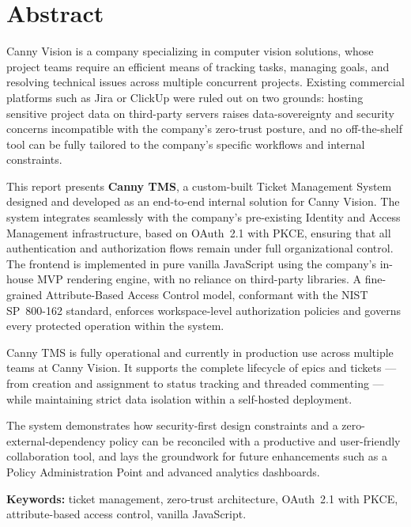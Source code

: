 \chapter*{Abstract}

{
Canny Vision is a company specializing in computer vision solutions, whose
project teams require an efficient means of tracking tasks, managing goals, and resolving
technical issues across multiple concurrent projects. Existing commercial platforms such as
Jira or ClickUp were ruled out on two grounds: hosting sensitive project data on third-party
servers raises data-sovereignty and security concerns incompatible with the company's
zero-trust posture, and no off-the-shelf tool can be fully tailored to the company's specific
workflows and internal constraints.

This report presents \textbf{Canny TMS}, a custom-built Ticket Management System designed
and developed as an end-to-end internal solution for Canny Vision. The system integrates
seamlessly with the company's pre-existing Identity and Access Management infrastructure,
based on OAuth~2.1 with PKCE, ensuring that all authentication and authorization flows
remain under full organizational control. The frontend is implemented in pure vanilla
JavaScript using the company's in-house MVP rendering engine, with no reliance on
third-party libraries. A fine-grained Attribute-Based Access Control model, conformant
with the NIST SP~800-162 standard, enforces workspace-level authorization policies and
governs every protected operation within the system.

Canny TMS is fully operational and currently in production use across multiple teams at
Canny Vision. It supports the complete lifecycle of epics and tickets --- from creation
and assignment to status tracking and threaded commenting --- while maintaining strict
data isolation within a self-hosted deployment.

The system demonstrates how security-first design constraints and a zero-external-dependency
policy can be reconciled with a productive and user-friendly collaboration tool, and lays
the groundwork for future enhancements such as a Policy Administration Point and advanced
analytics dashboards.

\bigskip
\noindent\textbf{Keywords:} ticket management, zero-trust architecture, OAuth~2.1 with PKCE,
attribute-based access control, vanilla JavaScript.
}
